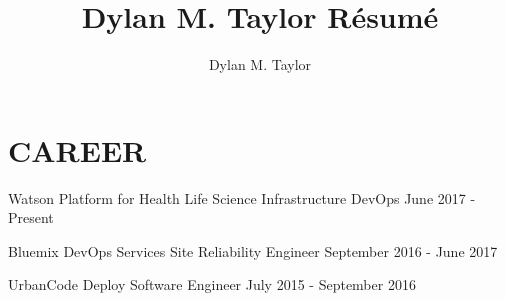 \documentclass[]{dylan-resume}
\author{Dylan M. Taylor}
\title{Dylan M. Taylor Résumé}
\begin{document}
\lastupdated




\hfill
\begin{minipage}[t]{1.00\textwidth}


\section{CAREER}
\href{https://www.ibm.com/}{}
\hspace*{\fill} \href{https://www.rtp.org/}{}
\vspace{\topsep} %
\begin{tightemize}
\item Watson Platform for Health Life Science Infrastructure DevOps \hspace*{\fill}June 2017 - Present
\item Bluemix DevOps Services Site Reliability Engineer \hspace*{\fill}September 2016 - June 2017
\item UrbanCode Deploy Software Engineer \hspace*{\fill}July 2015 - September 2016
\end{tightemize}
\sectionsep



\end{minipage}
\end{document}
